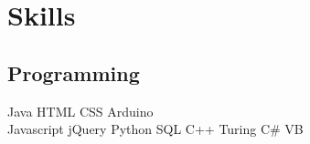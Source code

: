 \documentclass[]{deedy-resume-openfont}
\begin{document}
\begin{minipage}[t]{0.33\textwidth}
\sectionsep





\section{Skills}
\subsection{Programming}
Java \textbullet{} HTML \textbullet{} CSS \textbullet{} Arduino \\  %
\vspace{1mm}
Javascript  \textbullet{} jQuery \textbullet{} Python \textbullet{} SQL\hspace{10mm} C++ \textbullet{} Turing \textbullet{} C\# \textbullet{} VB\\
\vspace{1mm}
\sectionsep


\end{minipage}
\end{document}
